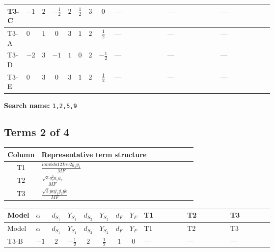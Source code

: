 \documentclass[8pt]{article}
\begin{document}
\begin{landscape}
\begin{longtable}{@{}llcccccc >{\raggedright\arraybackslash}p{0.21\linewidth} >{\raggedright\arraybackslash}p{0.21\linewidth} >{\raggedright\arraybackslash}p{0.21\linewidth}@{}}
\midrule
T3-C & $-1$ & $2$ & $-\frac{1}{2}$ & $2$ & $\frac{1}{2}$ & $3$ & $0$ & --- & --- & --- \\
\midrule
T3-A & $0$ & $1$ & $0$ & $3$ & $1$ & $2$ & $\frac{1}{2}$ & --- & --- & --- \\
\midrule
T3-D & $-2$ & $3$ & $-1$ & $1$ & $0$ & $2$ & $-\frac{1}{2}$ & --- & --- & --- \\
\midrule
T3-E & $0$ & $3$ & $0$ & $3$ & $1$ & $2$ & $\frac{1}{2}$ & --- & --- & --- \\
\midrule
\bottomrule
\end{longtable}
\clearpage
\noindent\textbf{Search name: }\texttt{1,2,5,9}\par\smallskip
\subsection*{Terms 2 of 4}
\begin{center}
\begin{tabular}{@{}c >{\raggedright\arraybackslash}p{0.82\linewidth}@{}}
\toprule
Column & Representative term structure \\
\midrule
T1 & \(\displaystyle \frac{lambda12Inv2 \overline{y_{1}} \overline{y_{2}}}{MF}\) \\
\midrule
T2 & \(\displaystyle \frac{\sqrt{3} g_{2}^{2} \overline{y_{1}} \overline{y_{2}}}{MF}\) \\
\midrule
T3 & \(\displaystyle \frac{\sqrt{3} ye \overline{y_{1}} \overline{y_{2}} \overline{ye}}{MF}\) \\
\midrule
\bottomrule
\end{tabular}
\end{center}
\smallskip
\tiny
\begin{longtable}{@{}llcccccc >{\raggedright\arraybackslash}p{0.21\linewidth} >{\raggedright\arraybackslash}p{0.21\linewidth} >{\raggedright\arraybackslash}p{0.21\linewidth}@{}}
\toprule
Model & $\alpha$ & $d_{S_1}$ & $Y_{S_1}$ & $d_{S_2}$ & $Y_{S_2}$ & $d_F$ & $Y_F$ & T1 & T2 & T3 \\
\midrule
\endfirsthead
\toprule
Model & $\alpha$ & $d_{S_1}$ & $Y_{S_1}$ & $d_{S_2}$ & $Y_{S_2}$ & $d_F$ & $Y_F$ & T1 & T2 & T3 \\
\midrule
\endhead
T3-B & $-1$ & $2$ & $-\frac{1}{2}$ & $2$ & $\frac{1}{2}$ & $1$ & $0$ & --- & --- & --- \\
\midrule

\end{longtable}
\end{landscape}
\end{document}

